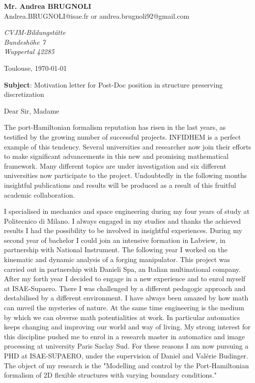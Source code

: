 \documentclass[11pt]{letter}
\begin{document}
 \begin{flushleft}
 {\bfseries Mr. Andrea \textsc{BRUGNOLI}}\\[.35ex]
 Andrea.BRUGNOLI@isae.fr or andrea.brugnoli92@gmail.com
 \end{flushleft}
 \begin{flushright}
 \small\itshape
 CVJM-Bildungstätte \\
Bundeshöhe 7 \\
Wuppertal 42285
 \end{flushright}
 \begin{flushright}
 Toulouse, \today 
 \end{flushright}
 \textbf{Subject}: Motivation letter for Post-Doc position in structure preserving discretization

 Dear Sir, Madame

The port-Hamiltonian formalism reputation has risen in the last years, as testified by the growing number of successful projects. INFIDHEM is a perfect example of this tendency. Several universities and researcher now join their efforts to make significant advancements in this new and promising mathematical framework. Many different topics are under investigation and six different universities now participate to the project. Undoubtedly in the following months insightful publications and results will be produced as a result of this fruitful academic collaboration.

 I specialised in mechanics and space engineering during my four years of study at Politecnico di Milano. I always engaged in my studies and thanks the achieved results I had the possibility to be involved in insightful experiences. During my second year of bachelor I could join an intensive formation in Labview, in partnership with National Instrument. The following year I worked on the kinematic and dynamic analysis of a forging manipulator. This project was carried out in partnership with Danieli Spa, an Italian multinational company.  After my forth year I decided to engage in a new experience and to enrol myself at ISAE-Supaero. There I was challenged by a different pedagogic approach and destabilised by a different environment.  I have always been amazed by how math can unveil the mysteries of nature. At the same time engineering is the medium by which we can obverse math potentialities at work. In particular automatics keeps changing and improving our world  and way of living. My strong interest for this discipline pushed me to enrol in a research master in automatics and image processing at university Paris Saclay Sud. For these reasons I am now pursuing a PHD at ISAE-SUPAERO, under the supervision of Daniel and Valérie Budinger. The object of my research is the "Modelling and control by the Port-Hamiltonian formalism of 2D flexible structures with varying boundary conditions."
\end{document}
